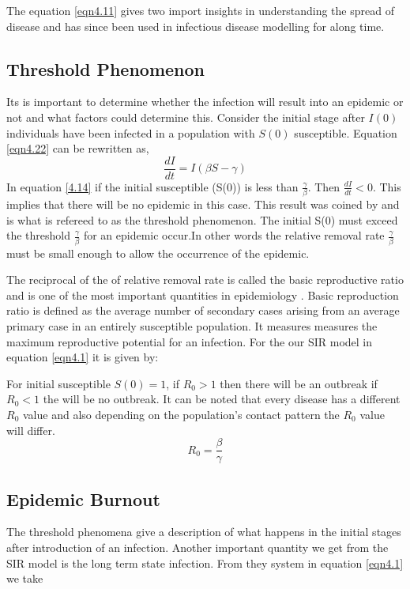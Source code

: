 The equation \ref{eqn4.11} gives two import insights in understanding the spread of disease and has since been used in infectious disease modelling for along time.

\subsection{Threshold Phenomenon} 
Its is important to determine whether the infection will result into an epidemic or not and what factors could determine this. Consider the initial stage after $I(0)$ individuals have been infected in a population with $S(0)$ susceptible. Equation \ref{eqn4.22} can be rewritten as,
\begin{equation} 
\frac{dI}{dt} = I \left(\beta S -\gamma \right)\label{4.14}
\end{equation}
 In equation \ref{4.14} if the initial susceptible (S(0)) is less than $\frac{\gamma}{\beta}$. Then $\frac{dI}{dt} < 0.$ This implies that there will be no epidemic in this case. This result was coined by \cite{m1925applications} and  is what is refereed to as the threshold phenomenon. The initial S(0) must exceed the threshold $\frac{\gamma}{\beta}$ for an epidemic occur.In  other words the relative removal rate $\frac{\gamma}{\beta}$ must be small enough to allow the occurrence  of the epidemic.
 
 The reciprocal of the of relative removal rate is called the basic reproductive ratio and is one of the most important quantities in epidemiology . Basic reproduction ratio is defined as the average number of secondary cases arising from an average primary case in an entirely susceptible population. It measures measures the maximum reproductive potential for an infection. For the our SIR model in equation \ref{eqn4.1} it is given by:
 
For initial susceptible $S(0) = 1$, if $R_0 >1$ then there will be an outbreak if $R_0<1$ the will be no outbreak. It can be noted that every disease has a different $R_0$ value and also depending on the population's contact pattern the $R_0$ value will differ.
\begin{equation}
R_0 = \frac{\beta}{\gamma}\label{eqn 4.15}
\end{equation}
 \subsection{Epidemic Burnout}
 The threshold phenomena give a description of what happens in the initial stages after introduction of an infection. Another important quantity we get from the SIR model is the long term state infection. From they system in equation \ref{eqn4.1} we take
 
